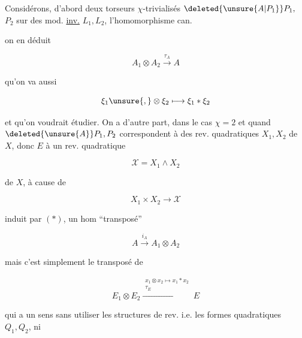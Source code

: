 
Considérons, d'abord deux torseurs $\chi$-trivialisés $\deleted{\unsure{A|P_1}}P_1,$ $P_2$ sur des mod. \uline{inv.} $L_1,L_2$, l'homomorphisme can.


on en déduit

\[
A_1\otimes A_2\xrightarrow{\tau_A}A
\]

qu'on va aussi 

\[
\xi_1\unsure{,}\otimes\xi_2\longmapsto\xi_1*\xi_2
\]

et qu'on voudrait étudier. On a d'autre part, dans le cas $\chi=2$ et quand $\deleted{\unsure{A}}P_1,P_2$ correspondent à  des rev. quadratiques $X_1,X_2$ de $X$, donc $E$ à un rev. quadratique

\[
\mathscr X=X_1\wedge X_2
\]

de $X$, à cause de

\[
X_1\times X_2\longrightarrow\mathscr X
\]

induit par $(*)$, un hom ``transposé''

\[
A\xrightarrow{i_A}A_1\otimes A_2
\]

mais c'est simplement le transposé de

\[
E_1\otimes E_2\xrightarrow{\substack{x_1\otimes x_2\mapsto x_1*x_2\\\tau_E}}E
\]

qui a  un sens sans utiliser les structures de rev. i.e. les formes quadratiques $Q_1,Q_2$, ni 


